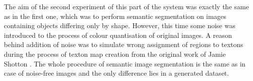 The aim of the second experiment of this part of the system was exactly the same as in the first one, which was to perform semantic segmentation on images containing objects differing only by shape. However, this time some noise was introduced to the process of colour quantisation of original images. A reason behind addition of noise was to simulate wrong assignment of regions to textons during the process of texton map creation from the original work of Jamie Shotton \cite{article_main}. The whole procedure of semantic image segmentation is the same as in case of noise-free images and the only difference lies in a generated dataset. 